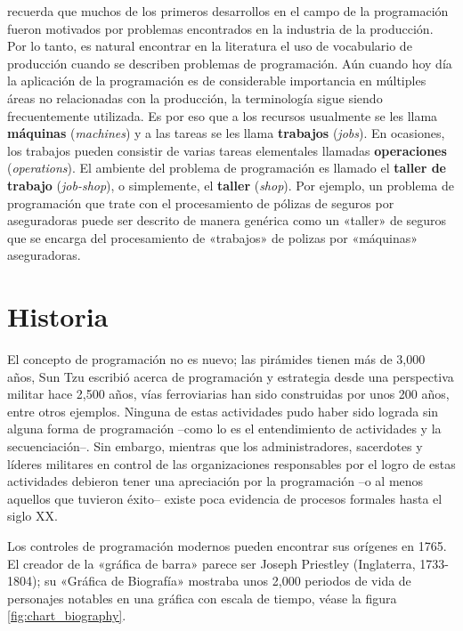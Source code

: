 \documentclass[draft,12pt,headsepline,footsepline,paper=letter]{scrreprt}
\begin{document}
\citet[p.~3]{Baker2009} recuerda que muchos de los primeros desarrollos en el campo de la programación fueron motivados por problemas encontrados en la industria de la producción. Por lo tanto, es natural encontrar en la literatura el uso de vocabulario de producción cuando se describen problemas de programación. Aún cuando hoy día la aplicación de la programación es de considerable importancia en múltiples áreas no relacionadas con la producción, la terminología sigue siendo frecuentemente utilizada. Es por eso que a los recursos usualmente se les llama \textbf{máquinas} (\textit{machines}) y a las tareas se les llama \textbf{trabajos} (\textit{jobs}). En ocasiones, los trabajos pueden consistir de varias tareas elementales llamadas \textbf{operaciones} (\textit{operations}). El ambiente del problema de programación es llamado el \textbf{taller de trabajo} (\textit{job-shop}), o simplemente, el \textbf{taller} (\textit{shop}). Por ejemplo, un problema de programación que trate con el procesamiento de pólizas de seguros por aseguradoras puede ser descrito de manera genérica como un «taller» de seguros que se encarga del procesamiento de «trabajos» de polizas por «máquinas» aseguradoras.

\section{Historia}
\label{historia_programación}

El concepto de programación no es nuevo; las pirámides tienen más de 3,000 años, Sun Tzu escribió acerca de programación y estrategia desde una perspectiva militar hace 2,500 años, vías ferroviarias han sido construidas por unos 200 años, entre otros ejemplos. Ninguna de estas actividades pudo haber sido lograda sin alguna forma de programación –como lo es el entendimiento de actividades y la secuenciación–. Sin embargo, mientras que los administradores, sacerdotes y líderes militares en control de las organizaciones responsables por el logro de estas actividades debieron tener una apreciación por la programación –o al menos aquellos que tuvieron éxito– existe poca evidencia de procesos formales hasta el siglo XX.

Los controles de programación modernos pueden encontrar sus orígenes en 1765. El creador de la «gráfica de barra» parece ser Joseph Priestley (Inglaterra, 1733-1804); su «Gráfica de Biografía» mostraba unos 2,000 periodos de vida de personajes notables en una gráfica con escala de tiempo, véase la figura \ref{fig:chart_biography}.
\end{document}
